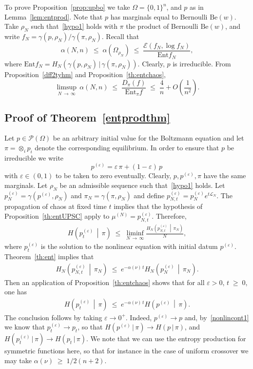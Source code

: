 \documentclass[AHL,Unicode,longabstracts,published]{cedram}
\renewcommand{\leq}{\;\leqslant\;}
\renewcommand{\geq}{\;\geqslant\;}
\newcommand{\e}{\varepsilon}
\newcommand{\tc}{\, |\, }
\newcommand{\ent}{\mathrm{Ent}}
\newcommand{\rBe}{\mathrm{Be}}
\newcommand{\cE}{\mathcal{E}}
\newcommand{\cL}{\mathcal{L}}
\newcommand{\cP}{\mathcal{P}}
\let\a=\alpha
\let\e=\varepsilon
\let\g=\gamma
\let\r=\rho
\let\O=\Omega
\begin{document}
To prove Proposition~\ref{prop:upbo} we take $\O=\{0,1\}^n$, and $p$ as in Lemma~\ref{lem:entprod}. Note that $p$ has marginals equal to Bernoulli $\rBe(w)$. Take $\r_N$ such that~\eqref{hypo1} holds with $\pi$ the product of Bernoulli $\rBe(w)$, and write $f_N = \g(p,\r_N)/\g(\pi,\r_N)$. Recall that
\begin{equation}\label{erdff2}
\a(N,n)\leq \a(\O_{\r_N})\leq \frac{\cE(f_N,\log f_N)}{\ent f_N},
\end{equation}
where $\ent f_N = H_N(\g(p,\r_N)\tc \g(\pi,\r_N))$. Clearly, $p$ is irreducible. From Proposition~\ref{dff2tyhm} and Proposition~\ref{th:entchaos},
\begin{equation}\label{errdff2}
\limsup_{N\,\to\,\infty}\,\a(N,n)\leq \frac{D_\pi(f)}{\ent_\pi f}\leq
\frac{4}{n} + O\left(\frac1{n^{2}}\right).
\end{equation}

\subsection{Proof of Theorem~\ref{entprodthm}}

Let $p\in\cP(\O)$ be an arbitrary initial value for the Boltzmann equation and let $\pi=\otimes_i p_i$ denote the corresponding equilibrium. In order to ensure that $p$ be irreducible we write
\[
p^{(\e)} = \e\,\pi + (1-\e)\,p\,
\]
with $\e\in(0,1)$ to be taken to zero eventually. Clearly, $p,p^{(\e)},\pi$ have the same marginals. Let $\r_N$ be an admissible sequence such that~\eqref{hypo1} holds. Let $p^{(\e)}_{N} = \g(p^{(\e)},\r_N)$ and $\pi_N = \g(\pi,\r_N)$ and define $p^{(\e)}_{N,t}=p^{(\e)}_{N}e^{t\cL_N}$. The propagation of chaos at fixed time $t$ implies that the hypothesis of Proposition~\ref{th:entUPSC} apply to $\mu^{(N)}=p^{(\e)}_{N,t}$. Therefore,
\begin{align}
H\left(p^{(\e)}_t\,\middle|\, \pi\right) \leq \liminf_{N\,\to\,\infty}\frac{H_N\left(p^{(\e)}_{N,t}\,\middle|\, \pi_N\right)}{N},
\end{align}
where $p^{(\e)}_t$ is the solution to the nonlinear equation with initial datum $p^{(\e)}$. Theorem~\ref{th:ent} implies that
\begin{align}
H_N\left(p^{(\e)}_{N,t}\,\middle|\, \pi_N\right)\leq e^{-\a(\nu)\,t}H_N\left(p^{(\e)}_{N}\,\middle|\, \pi_N\right).
\end{align}
Then an application of Proposition~\ref{th:entchaos} shows that for all $\e>0$, $t\geq 0$, one has
\begin{align}
H\left(p^{(\e)}_t\,\middle|\, \pi\right) \leq e^{-\a(\nu)\,t}H\left(p^{(\e)}\,\middle|\, \pi\right).
\end{align}
The conclusion follows by taking $\e\to 0^+$. Indeed, $p^{(\e)}\to p$ and, by~\eqref{nonlincont1} we know that $p^{(\e)}_t\to p_t$, so that $H(p^{(\e)}\tc\pi)\to H(p\tc\pi)$, and $H(p^{(\e)}_t\tc\pi)\to H(p_t\tc\pi)$. We note that we can use the entropy production for symmetric functions here, so that for instance in the case of uniform crossover we may take $\a(\nu)\geq 1/2(n+2)$.
\end{document}
